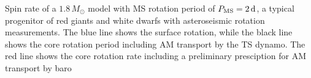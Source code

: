  \label{fig:MRI1.8rot} Spin rate of a $1.8 \, M_\odot$ model with MS rotation period of $P_{\rm MS} = 2 \, {\rm d}$, a typical progenitor of red giants and white dwarfs with asteroseismic rotation measurements. The blue line shows the surface rotation, while the black line shows the core rotation period including AM transport by the TS dynamo. The red line shows the core rotation rate including a preliminary presciption for AM transport by baro